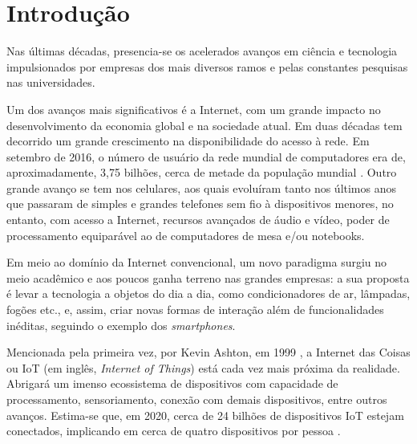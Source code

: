 \chapter{Introdução}










Nas últimas décadas, presencia-se os acelerados avanços em ciência e tecnologia impulsionados por empresas dos mais diversos ramos e pelas constantes pesquisas nas universidades. 


Um dos avanços mais significativos é a Internet, com um grande impacto no desenvolvimento da economia global e na sociedade atual. Em duas décadas tem decorrido um grande crescimento na disponibilidade do acesso à rede. Em setembro de 2016, o número de usuário da rede mundial de computadores era de, aproximadamente, 3,75 bilhões, cerca de metade da população mundial \cite{Stats2017}.  Outro grande avanço se tem nos celulares, aos quais evoluíram tanto nos últimos anos que passaram de simples e grandes telefones sem fio à dispositivos menores, no entanto, com acesso a Internet, recursos avançados de áudio e vídeo, poder de processamento equiparável ao de computadores de mesa e/ou notebooks.

Em meio ao domínio da Internet convencional, um novo paradigma surgiu no meio acadêmico e aos poucos ganha terreno nas grandes empresas: a sua proposta é levar a tecnologia a objetos do dia a dia, como condicionadores de ar, lâmpadas, fogões etc., e, assim, criar novas formas de interação além de funcionalidades inéditas, seguindo o exemplo dos \textit{smartphones}. 

Mencionada pela primeira vez, por Kevin Ashton, em 1999 \cite{Ashton2009}, a Internet das Coisas ou IoT (em inglês, \textit{Internet of Things}) está cada vez mais próxima da realidade. Abrigará um imenso ecossistema de dispositivos com capacidade de processamento, sensoriamento, conexão com demais dispositivos, entre outros avanços. Estima-se que, em 2020, cerca de 24 bilhões de dispositivos IoT estejam conectados, implicando em cerca de quatro dispositivos por pessoa \cite{Meola2016}. 

